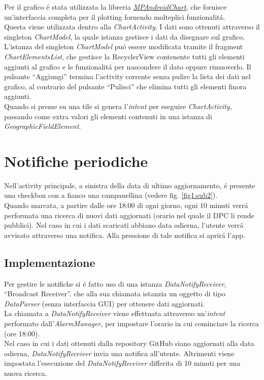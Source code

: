 \documentclass{article}
\newcommand{\quotes}[1]{``#1''}
\begin{document}
    Per il grafico é stata utilizzata la libreria \href{https://github.com/PhilJay/MPAndroidChart}{\emph{MPAndroidChart}}, 
    che fornisce un'interfaccia completa per il plotting fornendo molteplici funzionalitá.
    \\
    Questa viene utilizzata dentro alla \emph{ChartActivity}. I dati sono ottenuti attraverso il singleton \emph{ChartModel}, la quale istanza gestisce i dati da disegnare sul grafico.
    L'istanza del singleton \emph{ChartModel} puó essere modificata tramite il fragment \emph{ChartElementsList}, che gestisce la RecyclerView contenente tutti gli elementi aggiunti al grafico e le funzionalitá per nascondere il dato oppure rimuoverlo.
    Il pulsante \quotes{Aggiungi} termina l'activity corrente senza pulire la lista dei dati nel grafico, al contrario del pulsante \quotes{Pulisci} che elimina tutti gli elementi finora aggiunti.
    \\
    Quando si preme su una tile si genera l'\emph{intent} per eseguire \emph{ChartActivity}, passando come extra valori gli elementi contenuti in una istanza di \emph{GeographicFieldElement}.

    \section{Notifiche periodiche}
    Nell'activity principale, a sinistra della data di ultimo aggiornamento, é presente una checkbox con a fianco una campanellina (vedere fig. \ref{fig1:sub2}).
    \\
    Quando marcata, a partire dalle ore 18:00 di ogni giorno, ogni 10 minuti verrá performata una ricerca di nuovi dati aggiornati (orario nel quale il DPC li rende pubblici).
    Nel caso in cui i dati scaricati abbiano data odierna, l'utente verrá avvisato attraverso una notifica. Alla pressione di tale notifica si aprirá l'app.

    \subsection{Implementazione}
    
    Per gestire le notifiche si é fatto uso di una istanza \emph{DataNotifyReceiver}, \quotes{Broadcast Receiver}.
    che alla sua chiamata istanzia un oggetto di tipo \emph{DataParser} (senza interfaccia GUI) per ottenere dati aggiornati.
    \\
    La chiamata a \emph{DataNotifyReceiver} viene effettuata attraverso un'\emph{intent} performato dall'\emph{AlarmManager}, per impostare l'orario in cui cominciare la ricerca (ore 18:00).
    \\
    Nel caso in cui i dati ottenuti dalla repository GitHub siano aggiornati alla data odierna, \emph{DataNotifyReceiver} invia una notifica all'utente.
    Altrimenti viene impostata l'esecuzione del \emph{DataNotifyReceiver} differita di 10 minuti per una nuova ricerca.
\end{document}

